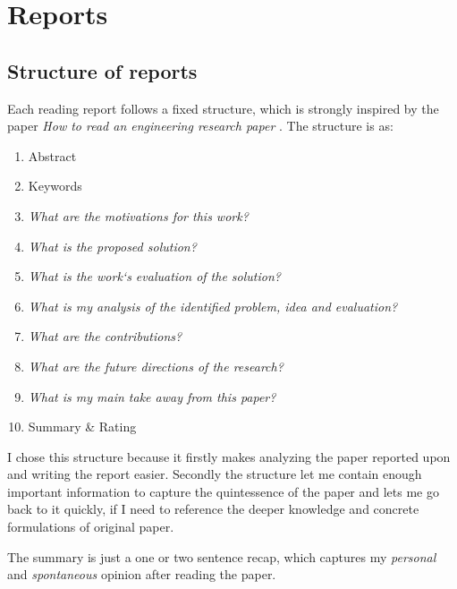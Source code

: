 


    \chapter{Reports}

    \section*{Structure of reports}

    Each reading report follows a fixed structure, which is strongly inspired by the paper \emph{How to read an engineering research paper} \cite{Griswold2009}.
    The structure is as: \ \begin{enumerate}
        \item Abstract
        \item Keywords
        \item \emph{What are the motivations for this work?}
        \item \emph{What is the proposed solution?}
        \item \emph{What is the work‘s evaluation of the solution?}
        \item \emph{What is my analysis of the identified problem, idea and evaluation?}
        \item \emph{What are the contributions?}
        \item \emph{What are the future directions of the research?}
        \item \emph{What is my main take away from this paper?}
        \item Summary \& Rating
    \end{enumerate}

    I chose this structure because it firstly makes analyzing the paper reported upon and writing the report easier. Secondly the structure let me contain enough important information to capture the quintessence of the paper and lets me go back to it quickly, if I need to reference the deeper knowledge and concrete formulations of original paper.

    The summary is just a one or two sentence recap, which captures my \emph{personal} and \emph{spontaneous} opinion after reading the paper. 


